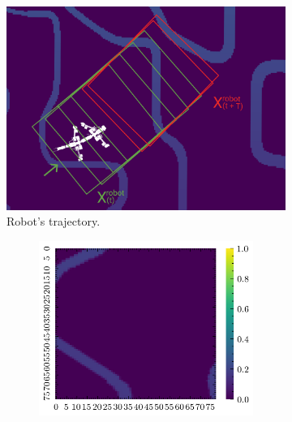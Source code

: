 \documentclass[../document.tex]{subfiles}
\begin{document}
\begin{figure}[H]
    \centering
    \begin{subfigure}[b]{0.66\textwidth}
    \includegraphics[width=\textwidth]{../img/krock-bars-correct-small.png}
    \caption{Robot's trajectory.}
\end{subfigure}
\begin{subfigure}[b]{1\textwidth}
    \begin{subfigure}[b]{0.19\textwidth}
    \includegraphics[width=\linewidth]{../img/bars1-example-patches/2d/0.png}
    \end{subfigure}
    \begin{subfigure}[b]{0.19\textwidth}

\end{subfigure}
\end{subfigure}
\end{figure}
\end{document}
